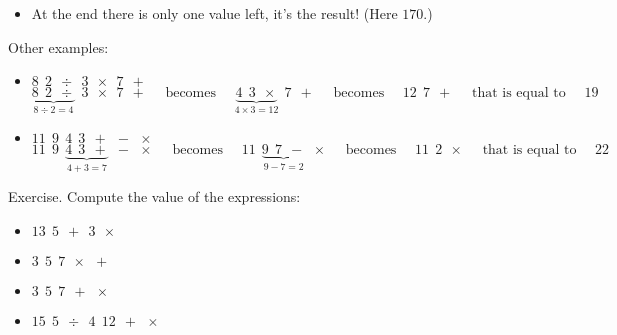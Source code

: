\documentclass[11pt,class=report,crop=false]{standalone}
\begin{document}
\begin{cours}
\begin{itemize}
  \item At the end there is only one value left, it's the result! (Here $170$.)
\end{itemize}

\bigskip

Other examples:
\begin{itemize}
  \item $8 \ \ 2 \ \ \div \ \ 3 \ \ \times \ \ 7 \ \ +$  
$$\underbrace{8 \ \ 2 \ \ \div}_{8 \div 2 = 4} \ \ 3 \ \ \times \ \ 7 \ \ +
\quad\text{ becomes }\quad
\underbrace{4 \ \ 3 \ \ \times}_{4 \times 3 = 12} \ \ 7 \ \ + 
\quad\text{ becomes }\quad
 12 \ \ 7 \ \ +
\quad\text{ that is equal to }\quad
19$$ 
 
  \item $11 \ \ 9 \ \ 4 \ \ 3 \ \ + \ \ - \ \ \times$  
$$11 \ \ 9 \ \ \underbrace{4 \ \ 3 \ \ +}_{4+3=7} \ \ - \ \ \times
\quad\text{ becomes }\quad
11 \ \ \underbrace{9 \ \ 7 \ \ -}_{9 - 7 = 2} \ \ \times 
\quad\text{ becomes }\quad
11 \ \ 2 \ \ \times
\quad\text{ that is equal to }\quad
22$$ 
\end{itemize}  

Exercise. Compute the value of the expressions:
\begin{itemize}
  \item $13 \ \ 5 \ \ + \ \ 3 \ \ \times$
  \item $3 \ \ 5 \ \ 7 \ \ \times \ \ +$
  \item $3 \ \ 5 \ \ 7 \ \ + \ \ \times$  
  \item $15 \ \ 5 \ \ \div \ \ 4 \ \ 12 \ \ + \ \ \times$
\end{itemize}

\end{cours}

\end{document}
